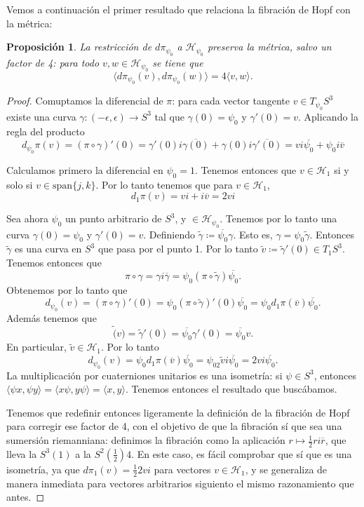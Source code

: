 \documentclass[11pt]{diazessay} %
\newtheorem{proposition}{Proposición}
\begin{document}
Vemos a continuación el primer resultado que relaciona la fibración de Hopf con la métrica:

\begin{proposition}
    La restricción de $d\pi_{\psi_0}$ a $\mathcal{H}_{\psi_0}$ preserva la métrica, salvo un factor de 4: para todo $v, w\in\mathcal{H}_{\psi_0}$ se tiene que
    \[\langle d\pi_{\psi_0}(v), d\pi_{\psi_0}(w)\rangle = 4\langle v,w\rangle.\]
\end{proposition}
\begin{proof}
    Comuptamos la diferencial de $\pi$: para cada vector tangente $v\in T_{\psi_0}S^3$ existe una curva $\gamma:(-\epsilon,\epsilon)\to S^3$ tal que $\gamma(0)=\psi_0$ y $\gamma'(0)=v$. Aplicando la regla del producto
    \[d_{\psi_0}\pi(v)=(\pi\circ\gamma)'(0)=\gamma'(0)i\overline{\gamma(0)}+\gamma(0)i\overline{\gamma'(0)} = vi\overline{\psi_0}+\psi_0i\overline{v}\]

    Calculamos primero la diferencial en $\psi_0=1$. Tenemos entonces que $v\in \mathcal{H}_1$ si y solo si $v \in \mathrm{span} \{j,k\}$. Por lo tanto tenemos que para $v\in\mathcal{H}_1$,
    \[d_1\pi(v)=vi+i\overline{v} = 2vi\]

    Sea ahora $\psi_0$ un punto arbitrario de $S^3$, y $\in \mathcal{H}_{\psi_0}$. Tenemos por lo tanto una curva $\gamma(0)=\psi_0$ y $\gamma'(0)=v$. Definiendo $\tilde{\gamma}\coloneqq \overline{\psi_0}\gamma$. Esto es, $\gamma = \psi_0\tilde{\gamma}$. Entonces $\tilde{\gamma}$ es una curva en $S^3$ que pasa por el punto 1. Por lo tanto $\tilde{v}\coloneqq \tilde{\gamma}'(0)\in T_1S^3$. Tenemos entonces que
    \[\pi\circ\gamma=\gamma i\overline{\gamma} = \psi_0(\pi\circ\tilde{\gamma})\overline{\psi_0}.\]
    Obtenemos por lo tanto que
    \[d_{\psi_0}(v) = (\pi\circ\gamma)'(0)=\psi_0(\pi\circ\tilde{\gamma})'(0)\overline{\psi_0}= \psi_0d_1\pi(\overline{v})\overline{\psi_0}.\]
    Además tenemos que \[\tilde(v)=\tilde{\gamma}'(0)=\overline{\psi_0}\gamma'(0)=\overline{\psi_0}v.\]
    En particular, $\tilde{v}\in\mathcal{H}_1$. Por lo tanto
    \[d_{\psi_0}(v) = \psi_0d_1\pi(\overline{v})\overline{\psi_0} = \psi_02\tilde{v}i\overline{\psi_0} = 2vi\overline{\psi_0}.\]
    La multiplicación por cuaterniones unitarios es una isometría: si $\psi\in S^3$, entonces $\langle \psi x, \psi y\rangle = \langle x\psi, y\psi\rangle = \langle x, y\rangle$. Tenemos entonces el resultado que buscábamos.

    Tenemos que redefinir entonces ligeramente la definición de la fibración de Hopf para corregir ese factor de 4, con el objetivo de que la fibración sí que sea una sumersión riemanniana: definimos la fibración como la aplicación $r\mapsto \frac{1}{2}ri\overline{r}$, que lleva la $S^3(1)$ a la $S^2(\frac{1}{2})4$. En este caso, es fácil comprobar que sí que es una isometría, ya que $d\pi_1(v) = \frac{1}{2}2vi$ para vectores $v\in\mathcal{H}_1$, y se generaliza de manera inmediata para vectores arbitrarios siguiento el mismo razonamiento que antes.


\end{proof}
\end{document}

